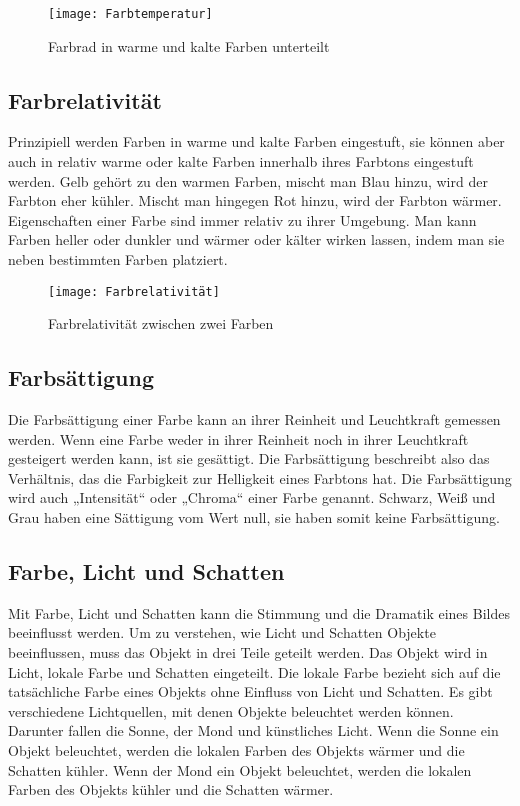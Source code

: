 \begin{figure}[H]
	\centering
	\texttt{[image: Farbtemperatur]}
	\caption{Farbrad in warme und kalte Farben unterteilt\cite{_special_subjects}}
\end{figure}

\subsection{Farbrelativität}
Prinzipiell werden Farben in warme und kalte Farben eingestuft, sie können aber auch in relativ warme oder kalte Farben innerhalb ihres Farbtons eingestuft werden. Gelb gehört zu den warmen Farben, mischt man Blau hinzu, wird der Farbton eher kühler. Mischt man hingegen Rot hinzu, wird der Farbton wärmer. Eigenschaften einer Farbe sind immer relativ zu ihrer Umgebung. Man kann Farben heller oder dunkler und wärmer oder kälter wirken lassen, indem man sie neben bestimmten Farben platziert.
\cite{_special_subjects}
\cite{_line_color_form}
\cite{_drawing_basics_and_video_game_art}

\begin{figure}[H]
	\centering
	\texttt{[image: Farbrelativität]}
	\caption{Farbrelativität zwischen zwei Farben\cite{_special_subjects}}
\end{figure}

\subsection{Farbsättigung}
Die Farbsättigung einer Farbe kann an ihrer Reinheit und Leuchtkraft gemessen werden. Wenn eine Farbe weder in ihrer Reinheit noch in ihrer Leuchtkraft gesteigert werden kann, ist sie gesättigt. Die Farbsättigung beschreibt also das Verhältnis, das die Farbigkeit zur Helligkeit eines Farbtons hat. Die Farbsättigung wird auch „Intensität“ oder „Chroma“ einer Farbe genannt. Schwarz, Weiß und Grau haben eine Sättigung vom Wert null, sie haben somit keine Farbsättigung. 
\cite{_special_subjects}
\cite{_line_color_form}\\

\subsection{Farbe, Licht und Schatten}
Mit Farbe, Licht und Schatten kann die Stimmung und die Dramatik eines Bildes beeinflusst werden. Um zu verstehen, wie Licht und Schatten Objekte beeinflussen, muss das Objekt in drei Teile geteilt werden. Das Objekt wird in Licht, lokale Farbe und Schatten eingeteilt. Die lokale Farbe bezieht sich auf die tatsächliche Farbe eines Objekts ohne Einfluss von Licht und Schatten. Es gibt verschiedene Lichtquellen, mit denen Objekte beleuchtet werden können. Darunter fallen die Sonne, der Mond und künstliches Licht. Wenn die Sonne ein Objekt beleuchtet, werden die lokalen Farben des Objekts wärmer und die Schatten kühler. Wenn der Mond ein Objekt beleuchtet, werden die lokalen Farben des Objekts kühler und die Schatten wärmer.
\cite{_special_subjects}
\cite{_line_color_form}
\cite{_drawing_basics_and_video_game_art}

